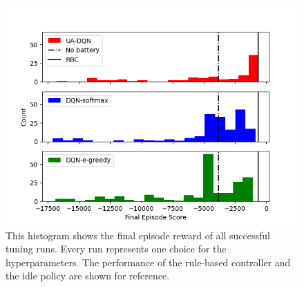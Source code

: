 \begin{figure}
  \centering
  \includegraphics[width=\figurewidth]{figures/tuning_results.png}
  \caption{This histogram shows the final episode reward of all successful tuning runs. Every run represents one choice for the hyperparameters. The performance of the rule-based controller and the idle policy are shown for reference.}
  \label{fig:tuning_results}
\end{figure}

